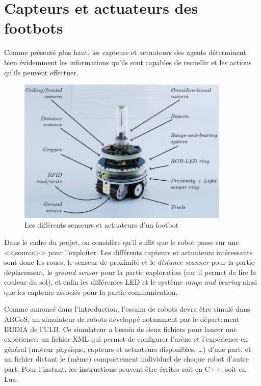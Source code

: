 \section{Capteurs et actuateurs des footbots}

Comme présenté plus haut, les capteurs et actuateurs des agents déterminent bien évidemment les informations qu'ils sont capables de recuellir et les actions qu'ils peuvent effectuer.

\begin{figure}[htb]
  \centering
  \includegraphics[width=0.9\textwidth]{pics/footbot.png}
  \caption{Les différents senseurs et actuateurs d'un footbot~\cite{argosSite1}}
\end{figure}

Dans le cadre du projet, on considère qu'il suffit que le robot passe sur une <<source>> pour l'exploiter. Les différents capteurs et actuateurs intéressants sont donc les roues, le senseur de proximité et le \emph{distance scanner} pour la partie déplacement, le \emph{ground sensor} pour la partie exploration (car il permet de lire la couleur du sol), et enfin les différentes LED et le système \emph{range and bearing} ainsi que les capteurs associés pour la partie communication.

Comme annoncé dans l'introduction, l'essaim de robots devra être simulé dans ARGoS, un simulateur de robots développé notamment par le département IRIDIA de l'ULB. Ce simulateur a besoin de deux fichiers pour lancer une expérience: un fichier XML qui permet de configurer l'arène et l'expérience en général (moteur physique, capteurs et actuateurs disponibles, \ldots) \cite{argosReport} d'une part, et un fichier dictant le (même) comportement individuel de chaque robot d'autre part. Pour l'instant, les instructions peuvent être écrites soit en C++, soit en Lua.



